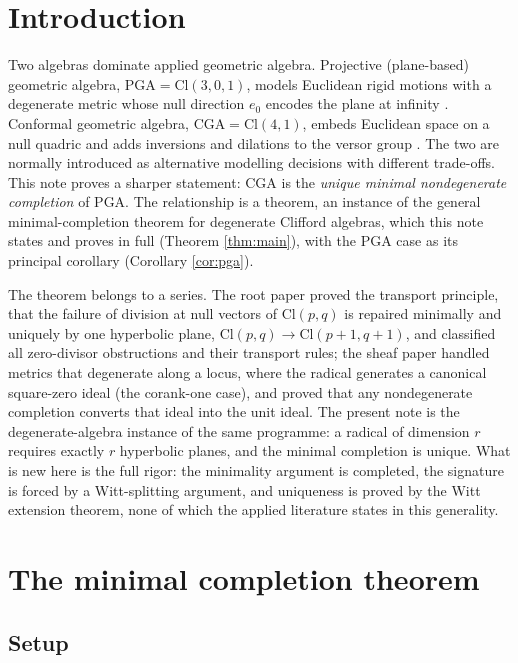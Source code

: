 \documentclass[11pt]{article}
\theoremstyle{definition}
\newcommand{\Cl}{\mathrm{Cl}}
\begin{document}
\newpage
\section{Introduction}\label{sec:intro}

Two algebras dominate applied geometric algebra. Projective (plane-based) geometric algebra, $\mathrm{PGA} = \Cl(3,0,1)$, models Euclidean rigid motions with a degenerate metric whose null direction $e_0$ encodes the plane at infinity \cite{Gunn2017, Selig2005}. Conformal geometric algebra, $\mathrm{CGA} = \Cl(4,1)$, embeds Euclidean space on a null quadric and adds inversions and dilations to the versor group \cite{HLR2001, DFM2007}. The two are normally introduced as alternative modelling decisions with different trade-offs. This note proves a sharper statement: CGA is the \emph{unique minimal nondegenerate completion} of PGA. The relationship is a theorem, an instance of the general minimal-completion theorem for degenerate Clifford algebras, which this note states and proves in full (Theorem \ref{thm:main}), with the PGA case as its principal corollary (Corollary \ref{cor:pga}).

The theorem belongs to a series. The root paper \cite{ButlerT1} proved the transport principle, that the failure of division at null vectors of $\Cl(p,q)$ is repaired minimally and uniquely by one hyperbolic plane, $\Cl(p,q) \to \Cl(p{+}1,q{+}1)$, and classified all zero-divisor obstructions and their transport rules; the sheaf paper \cite{ButlerT4} handled metrics that degenerate along a locus, where the radical generates a canonical square-zero ideal (the corank-one case), and proved that any nondegenerate completion converts that ideal into the unit ideal. The present note is the degenerate-algebra instance of the same programme: a radical of dimension $r$ requires exactly $r$ hyperbolic planes, and the minimal completion is unique. What is new here is the full rigor: the minimality argument is completed, the signature is forced by a Witt-splitting argument, and uniqueness is proved by the Witt extension theorem, none of which the applied literature states in this generality.

\section{The minimal completion theorem}\label{sec:theorem}

\subsection{Setup}
\end{document}
